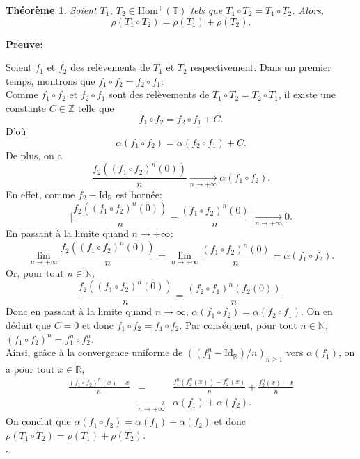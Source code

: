 \documentclass[11pt,a4 paper]{article}
\newtheorem{theoreme}{Théorème}[section]
\newcommand{\Tbb}{\mathbb{T}}
\newenvironment{thm}{\begin{box_thm}\begin{theoreme}}{\end{theoreme}\end{box_thm}}
\begin{document}
\begin{thm}\label{rho commute}
	Soient $T_1$, $T_2 \in \mathrm{Hom}^+(\Tbb)$ tels que $T_1\circ T_2=T_1 \circ T_2$. Alors, $$\rho(T_1\circ T_2)=\rho(T_1)+\rho(T_2).$$
\end{thm}

	\textbf{Preuve:}
	\par Soient $f_1$ et $f_2$ des relèvements de $T_1$ et $T_2$ respectivement. Dans un premier temps, montrons que $f_1 \circ f_2 = f_2 \circ f_1$:\\
	Comme $f_1 \circ f_2$ et $f_2 \circ f_1$ sont des relèvements de $T_1\circ T_2=T_2 \circ T_1$, il existe une constante $C \in \mathbb{Z}$ telle que
	$$f_1 \circ f_2 = f_2 \circ f_1 + C.$$
	D'où
	$$\alpha(f_1 \circ f_2) = \alpha(f_2 \circ f_1) + C.$$
	De plus, on a
	$$\frac{f_2((f_1\circ f_2)^n(0))}{n} \underset{n \to + \infty}{\longrightarrow} \alpha(f_1 \circ f_2).$$
	En effet, comme $f_2 - \mathrm{Id_{\mathbb{R}}}$ est bornée:
	$$\Big| \frac{f_2((f_1 \circ f_2)^n(0))}{n} - \frac{(f_1 \circ f_2)^n(0)}{n} \Big| \underset{n \to + \infty}{\longrightarrow}0.$$
	En passant à la limite quand $n \to + \infty$:
	$$\underset{n \to + \infty}{\lim} \frac{f_2((f_1 \circ f_2)^n(0))}{n} = \underset{n \to + \infty}{\lim} \frac{(f_1 \circ f_2)^n(0)}{n} = \alpha(f_1 \circ f_2).$$
	Or, pour tout $n \in \mathbb{N}$, 
	$$ \frac{f_2((f_1 \circ f_2)^n(0))}{n} = \frac{(f_2 \circ f_1)^n(f_2(0))}{n}.$$
	Donc en passant à la limite quand $n \to \infty$, $\alpha(f_1 \circ f_2) = \alpha(f_2 \circ f_1)$. On en déduit que $C = 0$ et donc $f_1 \circ f_2 = f_1 \circ f_2$. Par conséquent, pour tout $n \in \mathbb{N}$, $(f_1 \circ f_2)^n = f_1^n \circ f_2^n$.\\ 
	Ainsi, grâce à la convergence uniforme de $((f_1^n - \mathrm{Id_{\mathbb{R}}})/n)_{n\geq 1}$ vers $\alpha(f_1)$, on a pour tout $x \in \mathbb{R}$,
	\begin{eqnarray*}
	\frac{(f_1 \circ f_2)^n(x) - x}{n} &=& \frac{f_1^n(f_2^n(x)) - f_2^n(x)}{n} + \frac{f_2^n(x)-x}{n}\\
	&\underset{n \to + \infty}{\longrightarrow}& \alpha(f_1) + \alpha(f_2) .
	\end{eqnarray*}
	On conclut que $\alpha(f_1 \circ f_2) = \alpha(f_1) + \alpha(f_2)$ et donc $\rho(T_1 \circ T_2)= \rho (T_1) + \rho(T_2)$. 
	\begin{flushright}
		$\square$
	\end{flushright}
\end{document}
